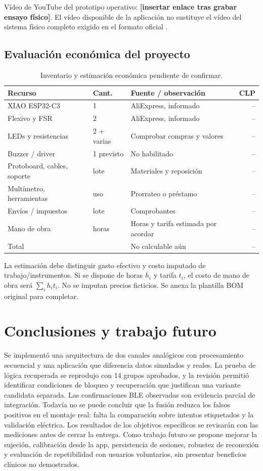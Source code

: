 \documentclass[11pt,letterpaper]{article}
\newcommand{\tabsmall}{\fontsize{10}{12}\selectfont}
\begin{document}
Vídeo de YouTube del prototipo operativo: \textbf{[insertar enlace tras grabar ensayo físico]}. El vídeo disponible de la aplicación no sustituye el vídeo del sistema físico completo exigido en el formato oficial \cite{formato}.
\subsection{Evaluación económica del proyecto}
\begin{table}[htbp]\centering\tabsmall\caption{Inventario y estimación económica pendiente de confirmar.}\label{tab:bom}
\begin{tabularx}{\linewidth}{@{}Y l Y r@{}}\toprule Recurso & Cant. & Fuente / observación & CLP \\\midrule
XIAO ESP32-C3 & 1 & AliExpress, informado & --\\
Flexivo y FSR & 2 & AliExpress, informado & --\\
LEDs y resistencias & 2 + varias & Comprobar compras y valores & --\\
Buzzer / driver & 1 previsto & No habilitado & --\\
Protoboard, cables, soporte & lote & Materiales y reposición & --\\
Multímetro, herramientas & uso & Prorrateo o préstamo & --\\
Envíos / impuestos & lote & Comprobantes & --\\
Mano de obra & horas & Horas y tarifa estimada por acordar & --\\\midrule Total & & No calculable aún & --\\\bottomrule\end{tabularx}\end{table}
La estimación debe distinguir gasto efectivo y costo imputado de trabajo/instrumentos. Si se dispone de horas $h_i$ y tarifa $t_i$, el costo de mano de obra será $\sum_i h_i t_i$. No se imputan precios ficticios. Se anexa la plantilla BOM original para completar.
\section{Conclusiones y trabajo futuro}
Se implementó una arquitectura de dos canales analógicos con procesamiento secuencial y una aplicación que diferencia datos simulados y reales. La prueba de lógica recuperada se reprodujo con 14 grupos aprobados, y la revisión permitió identificar condiciones de bloqueo y recuperación que justifican una variante candidata separada. Las confirmaciones BLE observadas son evidencia parcial de integración. Todavía no se puede concluir que la fusión reduzca los falsos positivos en el montaje real: falta la comparación sobre intentos etiquetados y la validación eléctrica. Los resultados de los objetivos específicos se revisarán con las mediciones antes de cerrar la entrega. Como trabajo futuro se propone mejorar la sujeción, calibración desde la app, persistencia de sesiones, robustez de reconexión y evaluación de repetibilidad con usuarios voluntarios, sin presentar beneficios clínicos no demostrados.
\clearpage
\end{document}
